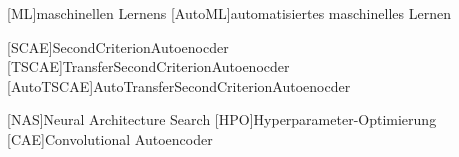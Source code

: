 \begin{acronym}[IEEE]
	[ML]{maschinellen Lernens}
	[AutoML]{automatisiertes maschinelles Lernen}
	
	[SCAE]{SecondCriterionAutoenocder}
	[TSCAE]{TransferSecondCriterionAutoenocder}
	[AutoTSCAE]{AutoTransferSecondCriterionAutoenocder}
	
	[NAS]{Neural Architecture Search}
	[HPO]{Hyperparameter-Optimierung}	
	[CAE]{Convolutional Autoencoder}	
\end{acronym}
